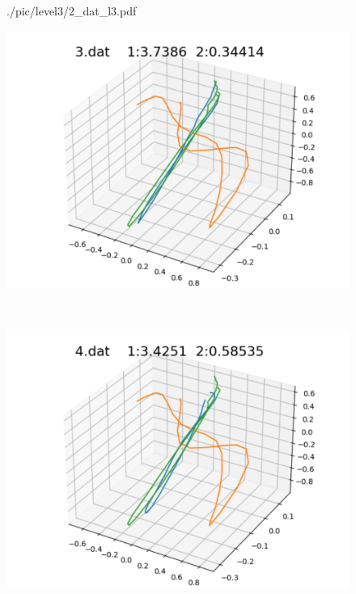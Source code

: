 \begin{figure}[h]
\begin{minipage}[b]{0.32\linewidth}
  {./pic/level3/2_dat_l3.pdf}
  \label{2dat}
 \end{minipage}
 \begin{minipage}[b]{0.32\linewidth}
  \centering
  \includegraphics[keepaspectratio, scale=0.3]
  {./pic/level3/3_dat_l3.pdf}
  \label{3dat}
 \end{minipage}\\
 \begin{minipage}[b]{0.32\linewidth}
  \centering
  \includegraphics[keepaspectratio, scale=0.3]
  {./pic/level3/4_dat_l3.pdf}
  \label{4dat}
 \end{minipage}
 \begin{minipage}[b]{0.32\linewidth}
  \centering

\end{minipage}
\end{figure}
